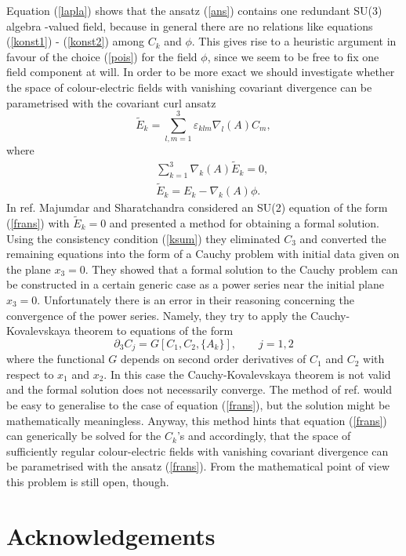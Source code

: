 \documentclass[a4paper,12pt]{article}
\begin{document}
Equation (\ref{lapla}) shows that the ansatz (\ref{ans}) contains one redundant SU(3) algebra -valued field, because in general there are no relations like equations (\ref{konst1}) - (\ref{konst2}) among $C_k$ and $\phi$. This gives rise to a heuristic argument in favour of the choice (\ref{pois}) for the field $\phi$, since we seem to be free to fix one field component at will. In order to be more exact we should investigate whether the space of colour-electric fields with vanishing covariant divergence can be parametrised with the covariant curl ansatz 
\begin{equation}\label{frans}
\widetilde{E}_k = \sum_{l,m=1}^3 \varepsilon_{klm} \nabla_l(A) C_m,
\end{equation}
where
\begin{eqnarray*}
&& \sum_{k=1}^3 \nabla_k(A) \widetilde{E}_k = 0, \\
&& \widetilde{E}_k = E_k - \nabla_k(A) \phi. 
\end{eqnarray*}
In ref. \cite{ms2} Majumdar and Sharatchandra considered an SU(2) equation of the form (\ref{frans}) with $\widetilde{E}_k = 0$ and presented a method for obtaining a formal solution. Using the consistency condition (\ref{ksum}) they eliminated $C_3$ and converted the remaining equations into the form of a Cauchy problem with initial data given on the plane $x_3=0$. They showed that a formal solution to the Cauchy problem can be constructed in a certain generic case as a power series near the initial plane $x_3=0$. Unfortunately there is an error in their reasoning concerning the convergence of the power series. Namely, they try to apply the Cauchy-Kovalevskaya theorem to equations of the form
$$ \partial_3 C_j = G[C_1, C_2, \{A_k\}], \qquad j=1,2 $$ 
where the functional $G$ depends on second order derivatives of $C_1$ and $C_2$ with respect to $x_1$ and $x_2$. In this case the Cauchy-Kovalevskaya theorem is not valid and the formal solution does not necessarily converge. The method of ref. \cite{ms2} would be easy to generalise to the case of equation (\ref{frans}), but the solution might be mathematically meaningless. Anyway, this method hints that equation (\ref{frans}) can generically be solved for the $C_k$'s and accordingly, that the space of sufficiently regular colour-electric fields with vanishing covariant divergence can be parametrised with the ansatz (\ref{frans}). From the mathematical point of view this problem is still open, though.

\section*{Acknowledgements}
\end{document}
